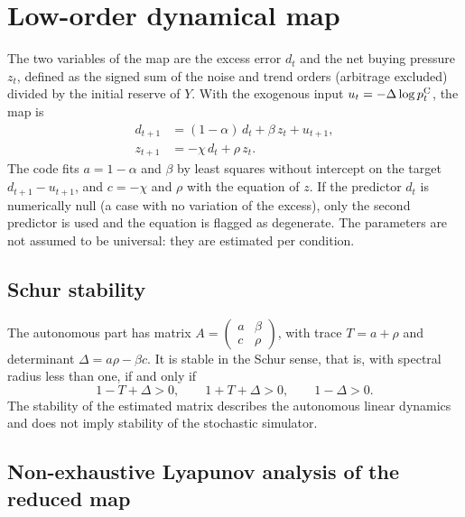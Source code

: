 \section{Low-order dynamical map}

The two variables of the map are the excess error $d_t$ and the net buying pressure $z_t$, defined as the signed sum of the noise and trend orders (arbitrage excluded) divided by the initial reserve of $Y$. With the exogenous input $u_t=-\Delta\log p^{\mathrm{C}}_t$, the map is
\begin{align}
  d_{t+1} &= (1-\alpha)\,d_t + \beta\,z_t + u_{t+1}, \label{eq:mapa-d}\\
  z_{t+1} &= -\chi\,d_t + \rho\,z_t. \label{eq:mapa-z}
\end{align}
The code fits $a=1-\alpha$ and $\beta$ by least squares without intercept on the target $d_{t+1}-u_{t+1}$, and $c=-\chi$ and $\rho$ with the equation of $z$. If the predictor $d_t$ is numerically null (a case with no variation of the excess), only the second predictor is used and the equation is flagged as degenerate. The parameters are not assumed to be universal: they are estimated per condition.

\subsection{Schur stability}

The autonomous part has matrix $A=\begin{pmatrix} a & \beta\\ c & \rho\end{pmatrix}$, with trace $T=a+\rho$ and determinant $\Delta=a\rho-\beta c$. It is stable in the Schur sense, that is, with spectral radius less than one, if and only if \cite{jury1962simplified,schur1917potenzreihen,elaydi2005difference}
\begin{equation}
  1-T+\Delta>0,\qquad 1+T+\Delta>0,\qquad 1-\Delta>0.
  \label{eq:schur}
\end{equation}
The stability of the estimated matrix describes the autonomous linear dynamics and does not imply stability of the stochastic simulator.

\subsection{Non-exhaustive Lyapunov analysis of the reduced map}

